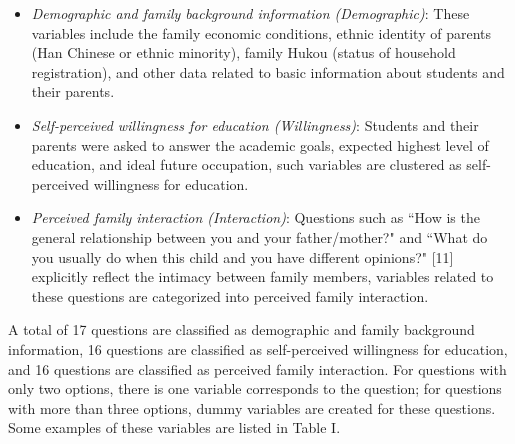 \documentclass[conference]{IEEEtran}
\begin{document}
\begin{itemize}
    \item \textit{Demographic and family background information (Demographic)}: These variables include the family economic conditions, ethnic identity of parents (Han Chinese or ethnic minority), family Hukou (status of household registration), and other data related to basic information about students and their parents.
    
    \item \textit{Self-perceived willingness for education (Willingness)}: Students and their parents were asked to answer the academic goals, expected highest level of education, and ideal future occupation, such variables are clustered as self-perceived willingness for education.
    
    \item \textit{Perceived family interaction (Interaction)}: Questions such as ``How is the general relationship between you and your father/mother?" and ``What do you usually do when this child and you have different opinions?" [11] explicitly reflect the intimacy between family members, variables related to these questions are categorized into perceived family interaction. 

\end{itemize}

A total of 17 questions are classified as demographic and family background information, 16 questions are classified as self-perceived willingness for education, and 16 questions are classified as perceived family interaction. For questions with only two options, there is one variable corresponds to the question; for questions with more than three options, dummy variables are created for these questions. Some examples of these variables are listed in Table I.
\end{document}

